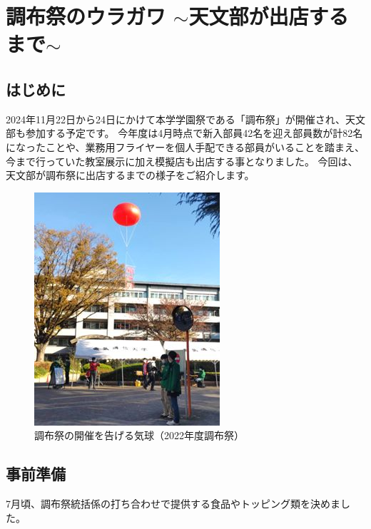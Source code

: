 \documentclass[../super_nova_20yy]{subfiles}
\begin{document}
  \chapter{調布祭のウラガワ $\sim$天文部が出店するまで$\sim$}


\section{はじめに}

2024年11月22日から24日にかけて本学学園祭である「調布祭」が開催され、天文部も参加する予定です。
今年度は4月時点で新入部員42名を迎え部員数が計82名になったことや、業務用フライヤーを個人手配できる部員がいることを踏まえ、今まで行っていた教室展示に加え模擬店も出店する事となりました。
今回は、天文部が調布祭に出店するまでの様子をご紹介します。

\begin{figure}[H]
  \centering
  \includegraphics[width=.5\columnwidth]{画像1.jpg}
  \caption{調布祭の開催を告げる気球（2022年度調布祭）}
  \label{fig:1}
\end{figure}

\section{事前準備}

7月頃、調布祭統括係の打ち合わせで提供する食品やトッピング類を決めました。
\end{document}
